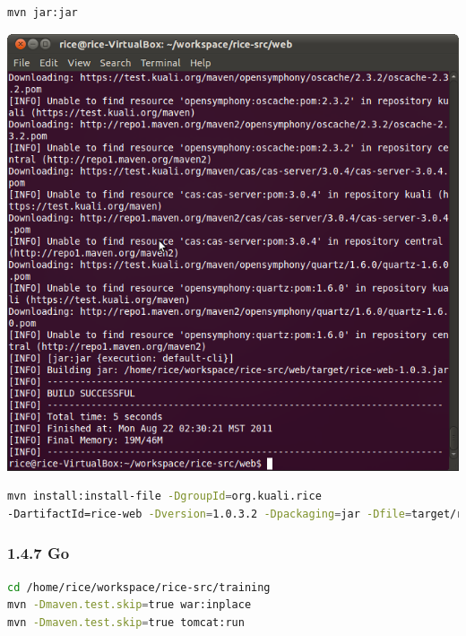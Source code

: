 \begin{lstlisting}[language=bash,basicstyle=\scriptsize,backgroundcolor=\color{ubergray},caption={Maven
  commans},frame=single,breaklines=true
]
mvn jar:jar
\end{lstlisting}
\includegraphics[width=\textwidth]{images/Screenshot7.png}

\begin{lstlisting}[language=bash,basicstyle=\scriptsize,backgroundcolor=\color{ubergray},caption={Maven
  commands},frame=single,breaklines=true
]
mvn install:install-file -DgroupId=org.kuali.rice
-DartifactId=rice-web -Dversion=1.0.3.2 -Dpackaging=jar -Dfile=target/rice-web-1.0.3.2.jar
\end{lstlisting}

\subsubsection*{1.4.7 Go}
\begin{lstlisting}[language=bash,basicstyle=\scriptsize,backgroundcolor=\color{ubergray},caption={Maven
  commands},frame=single,breaklines=true
]
cd /home/rice/workspace/rice-src/training
mvn -Dmaven.test.skip=true war:inplace
mvn -Dmaven.test.skip=true tomcat:run
\end{lstlisting}

